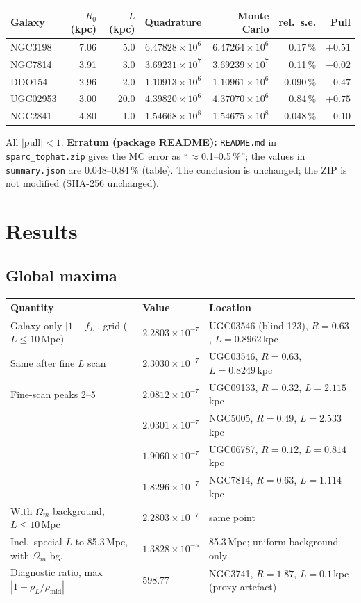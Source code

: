\documentclass[10pt,a4paper]{article}
\begin{document}
\begin{center}\small
\begin{tabular}{@{}lrrrrrr@{}}
\toprule
Galaxy & $R_0$ (kpc) & $L$ (kpc) & Quadrature & Monte Carlo & rel.\ s.e. & Pull\\
\midrule
NGC3198 & 7.06 & 5.0 & $6.47828\times10^{6}$ & $6.47264\times10^{6}$ & 0.17\,\% & $+0.51$\\
NGC7814 & 3.91 & 3.0 & $3.69231\times10^{7}$ & $3.69239\times10^{7}$ & 0.11\,\% & $-0.02$\\
DDO154 & 2.96 & 2.0 & $1.10913\times10^{6}$ & $1.10961\times10^{6}$ & 0.090\,\% & $-0.47$\\
UGC02953 & 3.00 & 20.0 & $4.39820\times10^{6}$ & $4.37070\times10^{6}$ & 0.84\,\% & $+0.75$\\
NGC2841 & 4.80 & 1.0 & $1.54668\times10^{8}$ & $1.54675\times10^{8}$ & 0.048\,\% & $-0.10$\\
\bottomrule
\end{tabular}
\end{center}
All $|\mathrm{pull}|<1$. \textbf{Erratum (package README):} \texttt{README.md} in \texttt{sparc\_tophat.zip} gives the MC error as ``$\approx$0.1--0.5\,\%''; the values in \texttt{summary.json} are 0.048--0.84\,\% (table). The conclusion is unchanged; the ZIP is not modified (SHA-256 unchanged).

\section{Results}
\subsection{Global maxima}
\begin{center}\small
\begin{tabularx}{\textwidth}{@{}llL@{}}
\toprule
Quantity & Value & Location\\
\midrule
Galaxy-only $|1-f_L|$, grid ($L\le10$\,Mpc) & $2.2803\times10^{-7}$ & UGC03546 (blind-123), $R=0.63$, $L=0.8962$\,kpc\\
Same after fine $L$ scan & $2.3030\times10^{-7}$ & UGC03546, $R=0.63$, $L=0.8249$\,kpc\\
Fine-scan peaks 2--5 & $2.0812\times10^{-7}$ & UGC09133, $R=0.32$, $L=2.115$\,kpc\\
 & $2.0301\times10^{-7}$ & NGC5005, $R=0.49$, $L=2.533$\,kpc\\
 & $1.9060\times10^{-7}$ & UGC06787, $R=0.12$, $L=0.814$\,kpc\\
 & $1.8296\times10^{-7}$ & NGC7814, $R=0.63$, $L=1.114$\,kpc\\
With $\Omega_m$ background, $L\le10$\,Mpc & $2.2803\times10^{-7}$ & same point\\
Incl.\ special $L$ to 85.3\,Mpc, with $\Omega_m$ bg. & $1.3828\times10^{-5}$ & 85.3\,Mpc; uniform background only\\
Diagnostic ratio, max $|1-\bar\rho_L/\rho_\mathrm{mid}|$ & 598.77 & NGC3741, $R=1.87$, $L=0.1$\,kpc (proxy artefact)\\
\bottomrule
\end{tabularx}
\end{center}
\end{document}
